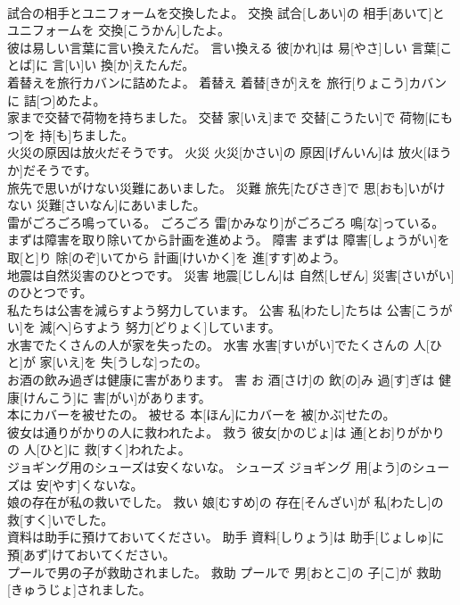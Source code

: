 \documentclass[8pt]{extreport}
\begin{document}
\begin{CJK}{UTF8}{min}
\\	試合の相手とユニフォームを交換したよ。	交換	試合[しあい]の 相手[あいて]とユニフォームを 交換[こうかん]したよ。	
\\	彼は易しい言葉に言い換えたんだ。	言い換える	彼[かれ]は 易[やさ]しい 言葉[ことば]に 言[い]い 換[か]えたんだ。	
\\	着替えを旅行カバンに詰めたよ。	着替え	着替[きが]えを 旅行[りょこう]カバンに 詰[つ]めたよ。	
\\	家まで交替で荷物を持ちました。	交替	家[いえ]まで 交替[こうたい]で 荷物[にもつ]を 持[も]ちました。	
\\	火災の原因は放火だそうです。	火災	火災[かさい]の 原因[げんいん]は 放火[ほうか]だそうです。	
\\	旅先で思いがけない災難にあいました。	災難	旅先[たびさき]で 思[おも]いがけない 災難[さいなん]にあいました。	
\\	雷がごろごろ鳴っている。	ごろごろ	雷[かみなり]がごろごろ 鳴[な]っている。	
\\	まずは障害を取り除いてから計画を進めよう。	障害	まずは 障害[しょうがい]を 取[と]り 除[のぞ]いてから 計画[けいかく]を 進[すす]めよう。	
\\	地震は自然災害のひとつです。	災害	地震[じしん]は 自然[しぜん] 災害[さいがい]のひとつです。	
\\	私たちは公害を減らすよう努力しています。	公害	私[わたし]たちは 公害[こうがい]を 減[へ]らすよう 努力[どりょく]しています。	
\\	水害でたくさんの人が家を失ったの。	水害	水害[すいがい]でたくさんの 人[ひと]が 家[いえ]を 失[うしな]ったの。	
\\	お酒の飲み過ぎは健康に害があります。	害	お 酒[さけ]の 飲[の]み 過[す]ぎは 健康[けんこう]に 害[がい]があります。	
\\	本にカバーを被せたの。	被せる	本[ほん]にカバーを 被[かぶ]せたの。	
\\	彼女は通りがかりの人に救われたよ。	救う	彼女[かのじょ]は 通[とお]りがかりの 人[ひと]に 救[すく]われたよ。	
\\	ジョギング用のシューズは安くないな。	シューズ	ジョギング 用[よう]のシューズは 安[やす]くないな。	
\\	娘の存在が私の救いでした。	救い	娘[むすめ]の 存在[そんざい]が 私[わたし]の 救[すく]いでした。	
\\	資料は助手に預けておいてください。	助手	資料[しりょう]は 助手[じょしゅ]に 預[あず]けておいてください。	
\\	プールで男の子が救助されました。	救助	プールで 男[おとこ]の 子[こ]が 救助[きゅうじょ]されました。	

\end{CJK}
\end{document}
